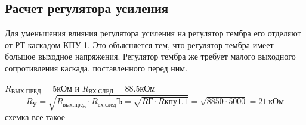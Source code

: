 \subsection{Расчет регулятора усиления}

  Для уменьшения влияния регулятора усиления на регулятор тембра его отделяют от РТ каскадом КПУ 1. Это объясняется тем, что регулятор тембра имеет большое выходное напряжения. Регулятор тембра же требует малого выходного сопротивления каскада, поставленного перед ним.\par
     $R_{\text{ВЫХ.ПРЕД}} = 5 $кОм  и   $R_{\text{ВХ.СЛЕД}} = 88.5 $кОм  
  \begin{equation}
   \label{eq:equation6_22}
     R_{\text{У}}=\sqrt{R_{\text{вых.пред}}\cdot {R_{\text{вх.след}}}Ъ=\sqrt{R{\text{Г}}\cdot R{\text{кпу1.1}}}}=\sqrt{8850 \cdot 5000}=21~\text{кОм}
   \end{equation}
     схемка все такое